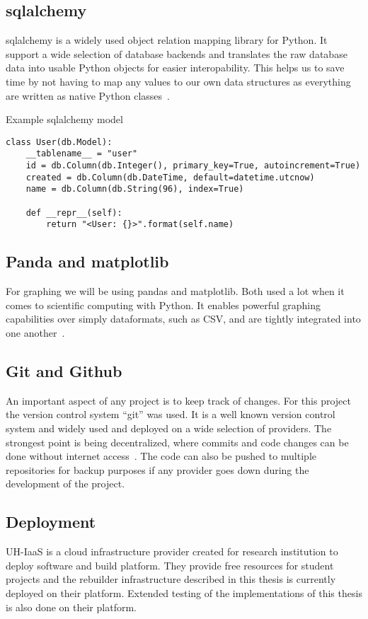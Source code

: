 \documentclass[../Main/thesis.tex]{subfiles}
\begin{document}
\subsection*{sqlalchemy}
sqlalchemy is a widely used object relation mapping library for Python. It
support a wide selection of database backends and translates the raw database
data into usable Python objects for easier interopability. This helps us to save
time by not having to map any values to our own data structures as everything
are written as native Python classes~\cite{sqlalchemy}.

\begin{listing}[ht]
\caption{Example sqlalchemy model}
\label{lst:sqlalchemy}
\begin{verbatim}
class User(db.Model):
    __tablename__ = "user"
    id = db.Column(db.Integer(), primary_key=True, autoincrement=True)
    created = db.Column(db.DateTime, default=datetime.utcnow)
    name = db.Column(db.String(96), index=True)

    def __repr__(self):
        return "<User: {}>".format(self.name)
\end{verbatim}
\end{listing}


\subsection*{Panda and matplotlib}
For graphing we will be using pandas and matplotlib. Both used a lot when it
comes to scientific computing with Python. It enables powerful graphing
capabilities over simply dataformats, such as CSV, and are tightly integrated
into one another~\cite{pandas}\cite{matplotlib}.

\subsection*{Git and Github}%
\label{sub:git_and_github}
An important aspect of any project is to keep track of changes. For this project
the version control system ``git'' was used. It is a well known version control
system and widely used and deployed on a wide selection of providers. The
strongest point is being decentralized, where commits and code changes can be
done without internet access~\cite{git}. The code can also be pushed to multiple
repositories for backup purposes if any provider goes down during the
development of the project.

\subsection*{Deployment}%
\label{sub:deployment}
UH-IaaS is a cloud infrastructure provider created for research institution to
deploy software and build platform. They provide free resources for student
projects and the rebuilder infrastructure described in this thesis is currently
deployed on their platform. Extended testing of the implementations of this
thesis is also done on their platform.
\end{document}
